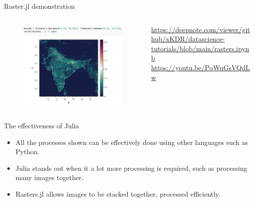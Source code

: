 \documentclass[aspectratio=169]{beamer} %
\begin{document}
        \begin{frame}{Raster.jl demonstration}
          \begin{columns}
            \begin{column}{0.6\textwidth}
              \begin{minipage}[c][0.7\textheight][c]{\linewidth}
                \begin{figure}
                  \includegraphics[width=\linewidth]{rasters_demo.png}
                \end{figure}
              \end{minipage}
            \end{column}
            \begin{column}{0.4\textwidth}
              \begin{minipage}[c][0.6\textheight][c]{\linewidth}
                  \url{https://deepnote.com/viewer/github/xKDR/datascience-tutorials/blob/main/rasters.ipynb}
                  \url{https://youtu.be/PqWuGsVQdLw}
              \end{minipage}
            \end{column}
          \end{columns}
        \end{frame}

        \begin{frame}{The effectiveness of Julia}
          \begin{itemize}
            \item All the processes shown can be effectively done using other languages such as Python. 
            \item Julia stands out when it a lot more processing is required, such as processing many images together. 
            \item Rasters.jl allows images to be stacked together, processed efficiently. 
          \end{itemize}
        \end{frame}
\end{document}
